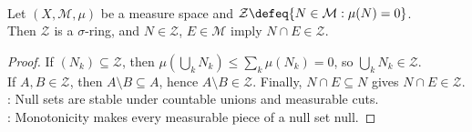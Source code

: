 \begin{proposition} \label{prop:null-sets-sigma-ideal} \\
Let $(X,\mathcal{M},\mu)$ be a measure space and $\mathcal{Z}\defeq\{N\in\mathcal{M}:\mu(N)=0\}$.\\
Then $\mathcal{Z}$ is a $\sigma$-ring, and $N\in\mathcal{Z}$, $E\in\mathcal{M}$ imply $N\cap E\in\mathcal{Z}$.
\begin{proof}
If $(N_k)\subseteq\mathcal{Z}$, then $\mu(\bigcup_kN_k)\leq\sum_k\mu(N_k)=0$, so $\bigcup_kN_k\in\mathcal{Z}$.\\
If $A,B\in\mathcal{Z}$, then $A\setminus B\subseteq A$, hence $A\setminus B\in\mathcal{Z}$. Finally, $N\cap E\subseteq N$ gives $N\cap E\in\mathcal{Z}$.\\
: Null sets are stable under countable unions and measurable cuts.\\
: Monotonicity makes every measurable piece of a null set null.
\end{proof}
\end{proposition}

